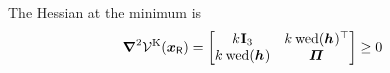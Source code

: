 The Hessian at the minimum is
\begin{align} 
 \differential^2\potentialStiff(\sysCoordR) &= \begin{bmatrix} \bodyStiffness{}{}\idMat[3] & \bodyStiffness{}{} \wedOp(\bodyCOS{}{})^\top \\ \bodyStiffness{}{}\wedOp(\bodyCOS{}{}) & \bodyMOS{}{} \end{bmatrix} \geq 0
\end{align}


